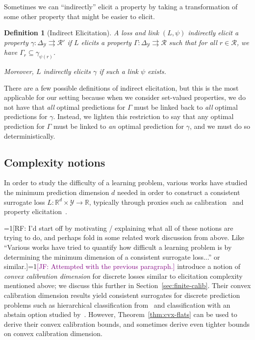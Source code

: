 \documentclass{article}
\newcommand{\Comments}{1}
\newcommand{\mynote}[2]{\ifnum\Comments=1\textcolor{#1}{#2}\fi}
\newcommand{\raf}[1]{\mynote{green!80!blue}{[RF: #1]}}
\newcommand{\jessie}[1]{\mynote{purple}{[JF: #1]}}
\newcommand{\reals}{\mathbb{R}}
\newcommand{\simplex}{\Delta_\Y}
\newcommand{\R}{\mathcal{R}}
\newcommand{\Y}{\mathcal{Y}}
\newcommand{\toto}{\rightrightarrows}
\newtheorem{definition}{Definition}
\begin{document}
Sometimes we can ``indirectly'' elicit a property by taking a transformation of some other property that might be easier to elicit.

\begin{definition}[Indirect Elicitation]\label{def:indirectly-elicits}
	A loss and link $(L, \psi)$ \emph{indirectly elicit} a property $\gamma:\simplex \toto \R'$ if $L$ elicits a property $\Gamma: \simplex \toto \R$ such that for all $r \in \R$, we have $\Gamma_r \subseteq \gamma_{\psi(r)}$.
	
	Moreover, $L$ indirectly elicits $\gamma$ if such a link $\psi$ exists.
\end{definition}

There are a few possible definitions of indirect elicitation, but this is the most applicable for our setting because when we consider set-valued properties, we do not have that \emph{all} optimal predictions for $\Gamma$ must be linked back to \emph{all} optimal predictions for $\gamma$.
Instead, we lighten this restriction to say that any optimal prediction for $\Gamma$ must be linked to \emph{an} optimal prediction for $\gamma$, and we must do so deterministically. 


\subsection{Complexity notions}\label{subsec:complexity}

In order to study the difficulty of a learning problem, various works have studied the minimum prediction dimension $d$ needed in order to construct a consistent surrogate loss $L: \reals^d \times \Y \to \reals$, typically through proxies such as calibration~\citep{ramaswamy2016convex} and property elicitation~\citep{frongillo2015vector-valued,fissler2015higher,frongillo2018elicitation}.

\raf{I'd start off by motivating / explaining what all of these notions are trying to do, and perhaps fold in some related work discussion from above.  Like ``Various works have tried to quantify how difficult a learning problem is by determining the minimum dimension of a consistent surrogate loss...'' or similar.}\jessie{Attempted with the previous paragraph.}
\citet{ramaswamy2016convex} introduce a notion of \emph{convex calibration dimension} for discrete losses similar to elicitation complexity mentioned above; we discuss this further in Section~\ref{sec:finite-calib}.
Their convex calibration dimension results yield consistent surrogates for discrete prediction problems such as hierarchical classification from~\citet{ramaswamy2015hierarchical} and classification with an abstain option studied by~\citet{ramaswamy2018consistent}.
However, Theorem~\ref{thm:cvx-flats} can be used to derive their convex calibration bounds, and sometimes derive even tighter bounds on convex calibration dimension.
\end{document}
